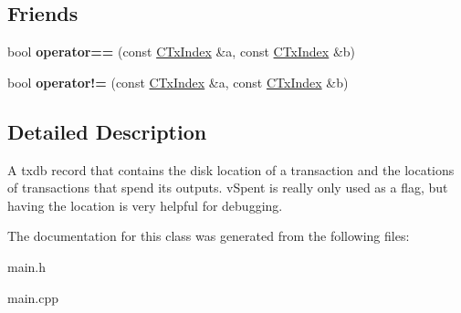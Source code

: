 \subsection*{Friends}
\begin{DoxyCompactItemize}
\item 
\mbox{\label{class_c_tx_index_acad959e5335e3527d1d94d7da3d5725d}} 
bool {\bfseries operator==} (const \mbox{\hyperlink{class_c_tx_index}{C\+Tx\+Index}} \&a, const \mbox{\hyperlink{class_c_tx_index}{C\+Tx\+Index}} \&b)
\item 
\mbox{\label{class_c_tx_index_a959f40582946a134bc75e7b3092419eb}} 
bool {\bfseries operator!=} (const \mbox{\hyperlink{class_c_tx_index}{C\+Tx\+Index}} \&a, const \mbox{\hyperlink{class_c_tx_index}{C\+Tx\+Index}} \&b)
\end{DoxyCompactItemize}


\subsection{Detailed Description}
A txdb record that contains the disk location of a transaction and the locations of transactions that spend its outputs. v\+Spent is really only used as a flag, but having the location is very helpful for debugging. 

The documentation for this class was generated from the following files\+:\begin{DoxyCompactItemize}
\item 
main.\+h\item 
main.\+cpp\end{DoxyCompactItemize}
